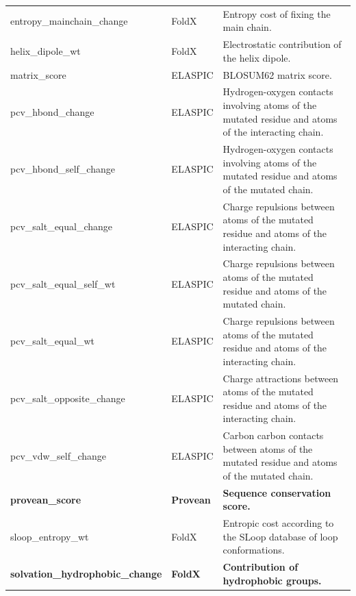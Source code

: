 \begin{table}[tb]
\begin{tabular}{ l | l | p{7cm} }
		entropy\_mainchain\_change                & FoldX            & Entropy cost of fixing the main chain.                                                              \\
		helix\_dipole\_wt                         & FoldX            & Electrostatic contribution of the helix dipole.                                                     \\
		matrix\_score                             & ELASPIC          & BLOSUM62 matrix score.                                                                              \\
		pcv\_hbond\_change                        & ELASPIC          & Hydrogen-oxygen contacts involving atoms of the mutated residue and atoms of the interacting chain. \\
		pcv\_hbond\_self\_change                  & ELASPIC          & Hydrogen-oxygen contacts involving atoms of the mutated residue and atoms of the mutated chain.     \\
		pcv\_salt\_equal\_change                  & ELASPIC          & Charge repulsions between atoms of the mutated residue and atoms of the interacting chain.          \\
		pcv\_salt\_equal\_self\_wt                & ELASPIC          & Charge repulsions between atoms of the mutated residue and atoms of the mutated chain.              \\
		pcv\_salt\_equal\_wt                      & ELASPIC          & Charge repulsions between atoms of the mutated residue and atoms of the interacting chain.          \\
		pcv\_salt\_opposite\_change               & ELASPIC          & Charge attractions between atoms of the mutated residue and atoms of the interacting chain.         \\
		pcv\_vdw\_self\_change                    & ELASPIC          & Carbon carbon contacts between atoms of the mutated residue and atoms of the mutated chain.         \\
		\textbf{provean\_score}                   & \textbf{Provean} & \textbf{Sequence conservation score.}                                                               \\
		sloop\_entropy\_wt                        & FoldX            & Entropic cost according to the SLoop database of loop conformations.                                \\
		\textbf{solvation\_hydrophobic\_change}   & \textbf{FoldX}   & \textbf{Contribution of hydrophobic groups.}                                                        \\

\end{tabular}
\end{table}
